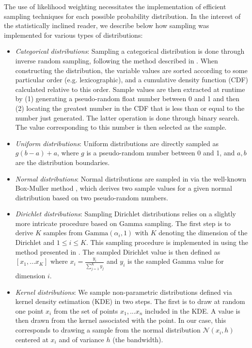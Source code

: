 The use of likelihood weighting necessitates the implementation of efficient sampling techniques for each possible probability distribution.  In the interest of the statistically inclined reader, we describe below how sampling was implemented for various types of distributions: 
\begin{itemize}
\item \textit{Categorical distributions}:  Sampling a categorical distribution is done through inverse random sampling, following the method described in \cite[][p. 489]{Koller+Friedman:09}. When constructing the distribution, the variable values are sorted according to some particular order (e.g. lexicographic), and a cumulative density function (CDF) calculated relative to this order.  Sample values are then extracted at runtime by (1) generating a pseudo-random float number between 0 and 1 and then (2) locating the greatest number in the CDF that is less than or equal to the number just generated.  The latter operation is done through binary search. The value corresponding to this number is then selected as the sample.
\item \textit{Uniform distributions}:  Uniform distributions are directly sampled as $g (b-a) + a$, where $g$ is a pseudo-random number between 0 and 1, and $a,b$ are the distribution boundaries.

\item \textit{Normal distributions}:  Normal distributions are sampled in \opendial via the well-known Box-Muller method \citep{rBOX58a}, which derives two sample values for a given normal distribution based on two pseudo-random numbers.

\item \textit{Dirichlet distributions}:  Sampling Dirichlet distributions relies on a slightly more intricate procedure based on Gamma sampling.   The first step is to derive $K$ samples from $\mathrm{Gamma} (\alpha_i, 1)$ with $K$ denoting the dimension of the Dirichlet and $1 \leq i \leq K$.  This sampling procedure is implemented in \opendial using the method presented in \cite{cheng1979}.  The sampled Dirichlet value is then defined as $[x_1,...x_K]$ where $x_i = \frac{y_i}{\sum_{j=1}^K y_j}$ and $y_i$ is the sampled Gamma value for dimension $i$.
\item \textit{Kernel distributions}:  We sample non-parametric distributions defined via kernel density estimation (KDE) in two steps. The first is to draw at random one point $x_i$ from the set of points $x_1,...x_n$ included in the KDE. A value is then drawn from the kernel associated with the point. In our case, this corresponds to drawing a sample from the normal distribution $\mathcal{N}(x_i,h)$ centered at $x_i$ and of variance $h$ (the bandwidth). 
\end{itemize}

